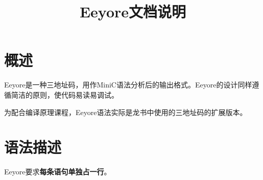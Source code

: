 \documentclass{ctexart}
\title{Eeyore文档说明}
\date{}
\author{}
\begin{document}
\maketitle

\section{概述}
Eeyore是一种三地址码，用作MiniC语法分析后的输出格式。Eeyore的设计同样遵循简洁的原则，使代码易读易调试。

为配合编译原理课程，Eeyore语法实际是龙书中使用的三地址码的扩展版本。



\section{语法描述}
Eeyore要求\textbf{每条语句单独占一行}。
\end{document}
